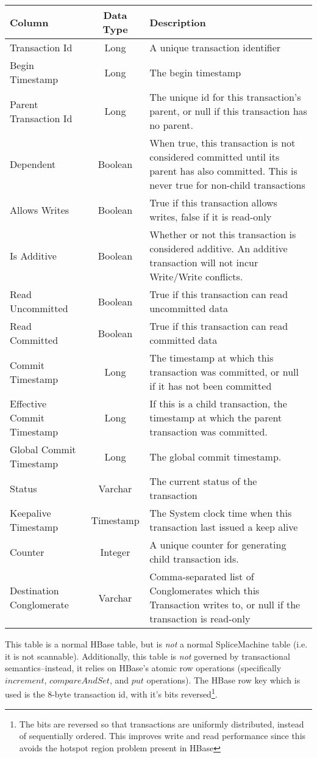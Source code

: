 \begin{center}
\begin{tabular}{|l|c|p{5cm}|}
				\hline
				\bf{Column}									&	\bf{Data Type}	&	\bf{Description} \\ \hline
				Transaction Id							&	Long			&	A unique transaction identifier \\ \hline
				Begin Timestamp							&	Long			&	The begin timestamp \\ \hline
				Parent Transaction Id				&	Long			&	The unique id for this transaction's parent, or null if this transaction has no parent.	\\ \hline
				Dependent										&	Boolean		& When true, this transaction is not considered committed until its parent has also committed. This is never true for non-child transactions\\ \hline
				Allows Writes								&	Boolean		&	True if this transaction allows writes, false if it is read-only \\ \hline
				Is Additive									&	Boolean		&	Whether or not this transaction is considered additive. An additive transaction will not incur Write/Write conflicts. \\ \hline
				Read Uncommitted						&	Boolean		&	True if this transaction can read uncommitted data \\ \hline
				Read Committed							&	Boolean		&	True if this transaction can read committed data \\ \hline
				Commit Timestamp						&	Long			&	The timestamp at which this transaction was committed, or null if it has not been committed \\	\hline
				Effective Commit Timestamp	&	Long			& If this is a child transaction, the timestamp at which the parent transaction was committed. \\ \hline
				Global Commit Timestamp			&	Long			&	The global commit timestamp. \\ \hline
				Status											&	Varchar		&	The current status of the transaction \\ \hline
				Keepalive Timestamp					&	Timestamp	& The System clock time when this transaction last issued a keep alive \\ \hline
				Counter											&	Integer		&	A unique counter for generating child transaction ids. \\ \hline
				Destination Conglomerate		&	Varchar		&	Comma-separated list of Conglomerates which this Transaction writes to, or null if the transaction is read-only	\\ \hline
\end{tabular}
\end{center}
This table is a normal HBase table, but is \emph{not} a normal SpliceMachine table (i.e. it is not scannable). Additionally, this table is \emph{not} governed by transactional semantics--instead, it relies on HBase's atomic row operations (specifically $increment$, $compareAndSet$, and $put$ operations). The HBase row key which is used is the 8-byte transaction id, with it's bits reversed\footnote{The bits are reversed so that transactions are uniformly distributed, instead of sequentially ordered. This improves write and read performance since this avoids the hotspot region problem present in HBase}.

